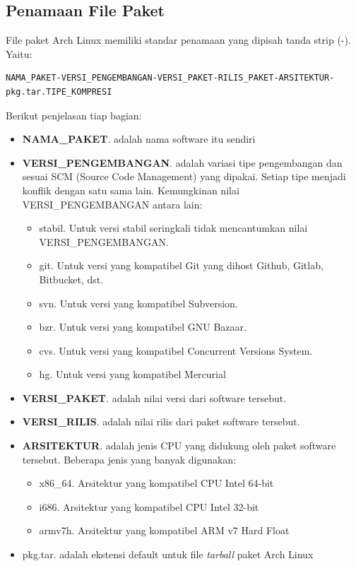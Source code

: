 \documentclass[12pt,]{article}
\begin{document}
	\subsection{Penamaan File Paket}
	File paket Arch Linux memiliki standar penamaan yang dipisah tanda strip (-).
	Yaitu:
	\begin{verbatim}
NAMA_PAKET-VERSI_PENGEMBANGAN-VERSI_PAKET-RILIS_PAKET-ARSITEKTUR-pkg.tar.TIPE_KOMPRESI
	\end{verbatim}
	Berikut penjelasan tiap bagian:	
	\begin{itemize}
		\item \textbf{NAMA\_PAKET}. adalah nama software itu sendiri
		\item \textbf{VERSI\_PENGEMBANGAN}. adalah variasi tipe pengembangan dan sesuai SCM (Source Code Management) yang dipakai.
		Setiap tipe menjadi konflik dengan satu sama lain.
		Kemungkinan nilai VERSI\_PENGEMBANGAN antara lain:
		\begin{itemize}
			\item stabil. Untuk versi stabil seringkali tidak mencantumkan nilai VERSI\_PENGEMBANGAN.
			\item git. Untuk versi yang kompatibel Git yang dihost Github, Gitlab, Bitbucket, dst.
			\item svn.  Untuk versi yang kompatibel Subversion.
			\item bzr. Untuk versi yang kompatibel GNU Bazaar.
			\item cvs. Untuk versi yang kompatibel Concurrent Versions System.
			\item hg. Untuk versi yang kompatibel Mercurial
		\end{itemize}
		\item \textbf{VERSI\_PAKET}. adalah nilai versi dari software tersebut.
		\item \textbf{VERSI\_RILIS}. adalah nilai rilis dari paket software tersebut.
		\item \textbf{ARSITEKTUR}. adalah jenis CPU yang didukung oleh paket software tersebut.
		Beberapa jenis yang banyak digunakan:
		\begin{itemize}
			\item x86\_64. Arsitektur yang kompatibel CPU Intel 64-bit
			\item i686. Arsitektur yang kompatibel CPU Intel 32-bit
			\item armv7h. Arsitektur yang kompatibel ARM v7 Hard Float
		\end{itemize}
		\item pkg.tar. adalah ekstensi default untuk file \textit{tarball} paket Arch Linux 

\end{itemize}
\end{document}
